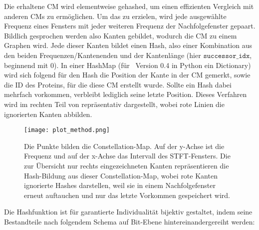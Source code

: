         Die erhaltene \ac{CM} wird elementweise gehashed, um einen effizienten Vergleich mit anderen \ac{CM}s zu ermöglichen. Um das zu erzielen, wird jede ausgewählte Frequenz eines Fensters mit jeder weiteren Frequenz der Nachfolgefenster gepaart. Bildlich gesprochen werden also Kanten gebildet, wodurch die \ac{CM} zu einem Graphen wird. Jede dieser Kanten bildet einen Hash, also einer Kombination aus den beiden Frequenzen/Kantenenden und der Kantenlänge (hier $\texttt{successor\_idx}$, beginnend mit 0). In einer HashMap (für \protfin\ Version 0.4 in Python ein Dictionary) wird sich folgend für den Hash die Position der Kante in der \ac{CM} gemerkt, sowie die ID des Proteins, für die diese \ac{CM} erstellt wurde. Sollte ein Hash dabei mehrfach vorkommen, verbleibt lediglich seine letzte Position. Dieses Verfahren wird im rechten Teil von  repräsentativ dargestellt, wobei rote Linien die ignorierten Kanten abbilden.

        \begin{figure}[H]
            \centering
            \texttt{[image: plot\_method.png]}
            \caption[Constellation-Map und Hashing]{Die Punkte bilden die Constellation-Map. Auf der y-Achse ist die Frequenz und auf der x-Achse das Intervall des STFT-Fensters. Die zur Übersicht nur rechts eingezeichneten Kanten repräsentieren die Hash-Bildung aus dieser Constellation-Map, wobei rote Kanten ignorierte Hashes darstellen, weil sie in einem Nachfolgefenster erneut auftauchen und nur das letzte Vorkommen gespeichert wird.}
            \label{fig:hashing}
        \end{figure}

        Die Hashfunktion ist für garantierte Individualität bijektiv gestaltet, indem seine Bestandteile nach folgendem Schema auf Bit-Ebene hintereinandergereiht werden:

